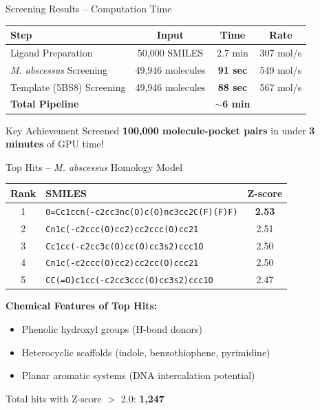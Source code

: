 \documentclass[aspectratio=169,xcolor=table]{beamer}
\begin{document}
\begin{frame}{Screening Results -- Computation Time}
\begin{center}
\begin{tabular}{lccc}
\toprule
\textbf{Step} & \textbf{Input} & \textbf{Time} & \textbf{Rate} \\
\midrule
Ligand Preparation & 50,000 SMILES & 2.7 min & 307 mol/s \\
\textit{M. abscessus} Screening & 49,946 molecules & \textbf{91 sec} & 549 mol/s \\
Template (5BS8) Screening & 49,946 molecules & \textbf{88 sec} & 567 mol/s \\
\midrule
\textbf{Total Pipeline} & & \textbf{$\sim$6 min} & \\
\bottomrule
\end{tabular}
\end{center}

\vspace{0.3cm}
\begin{alertblock}{Key Achievement}
Screened \textbf{100,000 molecule-pocket pairs} in under \textbf{3 minutes} of GPU time!
\end{alertblock}
\end{frame}

\begin{frame}{Top Hits -- \textit{M. abscessus} Homology Model}
\begin{center}
\scriptsize
\begin{tabular}{clc}
\toprule
\textbf{Rank} & \textbf{SMILES} & \textbf{Z-score} \\
\midrule
1 & \texttt{O=Cc1ccn(-c2cc3nc(O)c(O)nc3cc2C(F)(F)F)} & \textbf{2.53} \\
2 & \texttt{Cn1c(-c2ccc(O)cc2)cc2ccc(O)cc21} & 2.51 \\
3 & \texttt{Cc1cc(-c2cc3c(O)cc(O)cc3s2)ccc1O} & 2.50 \\
4 & \texttt{Cn1c(-c2ccc(O)cc2)cc2cc(O)ccc21} & 2.50 \\
5 & \texttt{CC(=O)c1cc(-c2cc3ccc(O)cc3s2)ccc1O} & 2.47 \\
\bottomrule
\end{tabular}
\end{center}
\normalsize

\vspace{0.2cm}
\textbf{Chemical Features of Top Hits:}
\begin{itemize}\setlength{\itemsep}{0pt}
    \item Phenolic hydroxyl groups (H-bond donors)
    \item Heterocyclic scaffolds (indole, benzothiophene, pyrimidine)
    \item Planar aromatic systems (DNA intercalation potential)
\end{itemize}

\footnotesize Total hits with Z-score $>$ 2.0: \textbf{1,247}
\end{frame}
\end{document}

